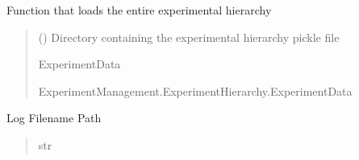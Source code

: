 \documentclass[letterpaper,10pt,english]{sphinxmanual}
\begin{document}
\begin{fulllineitems}
\begin{fulllineitems}
\begin{quote}
\begin{description}
\end{description}\end{quote}

\end{fulllineitems}


\begin{fulllineitems}
\label{\detokenize{ExperimentHierarchy:ExperimentHierarchy.ExperimentData.load_experiments}}
\pysigstartsignatures
{}
\pysigstopsignatures
\sphinxAtStartPar
Function that loads the entire experimental hierarchy
\begin{quote}\begin{description}
\sphinxAtStartPar
{} () \textendash{} Directory containing the experimental hierarchy pickle file

\sphinxAtStartPar
ExperimentData

\sphinxAtStartPar
ExperimentManagement.ExperimentHierarchy.ExperimentData

\end{description}\end{quote}

\end{fulllineitems}


\begin{fulllineitems}
\label{\detokenize{ExperimentHierarchy:ExperimentHierarchy.ExperimentData.log_file}}
\pysigstartsignatures
{}
\pysigstopsignatures
\sphinxAtStartPar
Log Filename Path
\begin{quote}\begin{description}
\sphinxAtStartPar
str


\end{description}
\end{quote}
\end{fulllineitems}
\end{fulllineitems}
\end{document}
